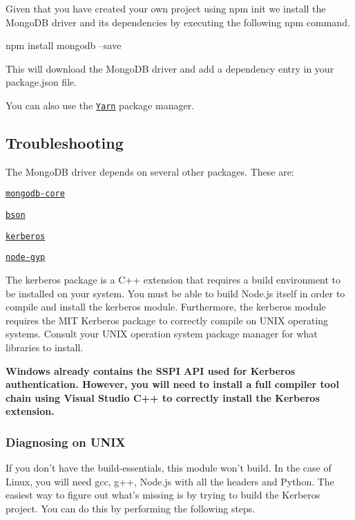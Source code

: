 Given that you have created your own project using {\ttfamily npm init} we install the Mongo\+DB driver and its dependencies by executing the following {\ttfamily npm} command.


\begin{DoxyCode}
npm install mongodb --save
\end{DoxyCode}


This will download the Mongo\+DB driver and add a dependency entry in your {\ttfamily package.\+json} file.

You can also use the \href{https://yarnpkg.com/en}{\tt Yarn} package manager.

\subsection*{Troubleshooting}

The Mongo\+DB driver depends on several other packages. These are\+:


\begin{DoxyItemize}
\item \href{https://github.com/mongodb-js/mongodb-core}{\tt mongodb-\/core}
\item \href{https://github.com/mongodb/js-bson}{\tt bson}
\item \href{https://github.com/mongodb-js/kerberos}{\tt kerberos}
\item \href{https://github.com/nodejs/node-gyp}{\tt node-\/gyp}
\end{DoxyItemize}

The {\ttfamily kerberos} package is a C++ extension that requires a build environment to be installed on your system. You must be able to build Node.\+js itself in order to compile and install the {\ttfamily kerberos} module. Furthermore, the {\ttfamily kerberos} module requires the M\+IT Kerberos package to correctly compile on U\+N\+IX operating systems. Consult your U\+N\+IX operation system package manager for what libraries to install.

{\bfseries Windows already contains the S\+S\+PI A\+PI used for Kerberos authentication. However, you will need to install a full compiler tool chain using Visual Studio C++ to correctly install the Kerberos extension.}

\subsubsection*{Diagnosing on U\+N\+IX}

If you don’t have the build-\/essentials, this module won’t build. In the case of Linux, you will need gcc, g++, Node.\+js with all the headers and Python. The easiest way to figure out what’s missing is by trying to build the Kerberos project. You can do this by performing the following steps.


